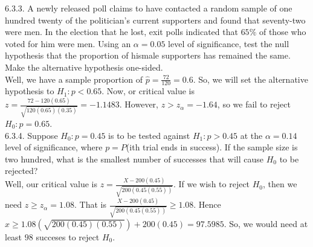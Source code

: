 \documentclass[12pt]{article}
\begin{document}
6.3.3. A newly released poll claims to have contacted a random sample of one hundred twenty of the politician’s current supporters and found that seventy-two were men. In the election that he lost, exit polls indicated that $65\%$ of those who voted for him were men. Using an $\alpha=0.05$ level of significance, test the null hypothesis that the proportion of hismale supporters has remained the same. Make the alternative hypothesis one-sided.\\
Well, we have a sample proportion of $\hat{p}=\frac{72}{120}=0.6$. So, we will set the alternative hypothesis to $H_1:p<0.65$. Now, or critical value is $z=\frac{72-120(0.65)}{\sqrt{120(0.65)(0.35)}}=-1.1483$. However, $z>z_{\alpha}=-1.64$, so we fail to reject $H_0:p=0.65$.\\[20pt]

6.3.4. Suppose $H_0:p=0.45$ is to be tested against $H_1:p>0.45$ at the $\alpha=0.14$ level of significance, where $p =P$(ith trial ends in success). If the sample size is two hundred, what is the smallest number of successes that will cause $H_0$ to be rejected?\\
Well, our critical value is $z=\frac{X-200(0.45)}{\sqrt{200(0.45(0.55))}}$. If we wish to reject $H_0$, then we need $z\geq z_{\alpha}=1.08$. That is $\frac{X-200(0.45)}{\sqrt{200(0.45(0.55))}}\geq1.08$. Hence $x\geq1.08(\sqrt{200(0.45)(0.55)})+200(0.45)=97.5985$. So, we would need at least $98$ succeses to reject $H_0$.
\end{document}
